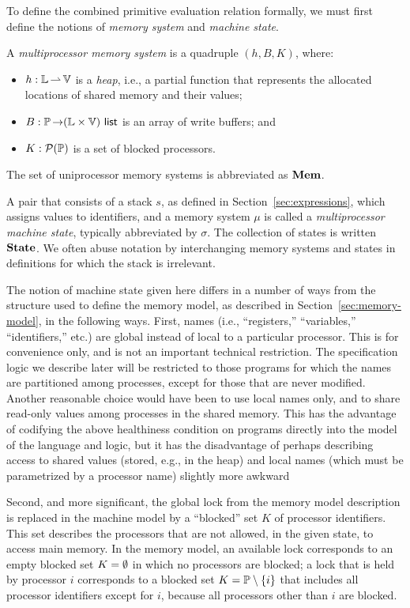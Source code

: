 \documentclass[11pt]{report}
\begin{document}
To define the combined primitive evaluation relation formally, we must first define the notions of \emph{memory system} and \emph{machine state}. 
\begin{definition}
A \emph{multiprocessor memory system} is a quadruple $(h,B,K)$, where: \begin{itemize}
	\item $h : \mathbb{L} \operatorname{\rightharpoonup} \mathbb{V}$ is a \emph{heap}, i.e., a partial function that represents the allocated locations of shared memory and their values; 
	\item $B : \mathbb{P} \operatorname{\rightarrow} (\mathbb{L} \times \mathbb{V})~\mathsf{list}$ is an array of write buffers; and
	\item $K : \mathcal{P}(\mathbb{P})$ is a set of blocked processors.
\end{itemize} 
\end{definition} 
The set of uniprocessor memory systems is abbreviated as $\mathbf{Mem}$.

A pair that consists of a stack $s$, as defined in Section~\ref{sec:expressions}, which assigns values to identifiers, and a memory system $\mu$ is called a \emph{multiprocessor machine state}, typically abbreviated by $\sigma$. The collection of states is written $\mathbf{State}$. We often abuse notation by interchanging memory systems and states in definitions for which the stack is irrelevant. 

The notion of machine state given here differs in a number of ways from the structure used to define the memory model, as described in Section~\ref{sec:memory-model}, in the following ways. First, names (i.e., ``registers,'' ``variables,'' ``identifiers,'' etc.) are global instead of local to a particular processor. This is for convenience only, and is not an important technical restriction. The specification logic we describe later will be restricted to those programs for which the names are partitioned among processes, except for those that are never modified. Another reasonable choice would have been to use local names only, and to share read-only values among processes in the shared memory. This has the advantage of codifying the above healthiness condition on programs directly into the model of the language and logic, but it has the disadvantage of perhaps describing access to shared values (stored, e.g., in the heap) and local names (which must be parametrized by a processor name) slightly more awkward

Second, and more significant, the global lock from the memory model description is replaced in the machine model by a ``blocked'' set $K$ of processor identifiers. This set describes the processors that are not allowed, in the given state, to access main memory. In the memory model, an available lock corresponds to an empty blocked set $K = \operatorname{\emptyset}$ in which no processors are blocked; a lock that is held by processor $i$ corresponds to a blocked set $K = \mathbb{P} \setminus \left\lbrace i \right\rbrace$ that includes all processor identifiers except for $i$, because all processors other than $i$ are blocked. 
\end{document}
